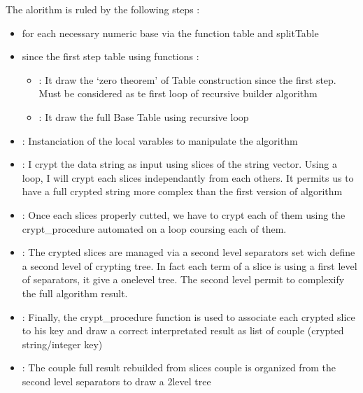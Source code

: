 \documentclass[letterpaper,10pt,english]{sphinxmanual}
\begin{document}
\sphinxAtStartPar
The alorithm is ruled by the following steps :
\begin{itemize}
\item {} 
\sphinxAtStartPar
{} for each necessary numeric base via the function table and splitTable

\item {} 
\sphinxAtStartPar
{} since the first step table using functions :
\begin{itemize}
\item {} 
\sphinxAtStartPar
{} : It draw the ‘zero theorem’ of Table construction since the first step. Must be considered as te first loop of recursive builder algorithm

\item {} 
\sphinxAtStartPar
{} : It draw the full Base Table using recursive loop

\end{itemize}

\item {} 
\sphinxAtStartPar
{} : Instanciation of the local varables to manipulate the algorithm

\item {} 
\sphinxAtStartPar
{} : I crypt the data string as input using slices of the string vector. Using a loop, I will crypt each slices independantly from each others. It permits us to have a full crypted string more complex than the first version of algorithm

\item {} 
\sphinxAtStartPar
{} : Once each slices properly cutted, we have to crypt each of them using the crypt\_procedure automated on a loop coursing each of them.

\item {} 
\sphinxAtStartPar
{} : The crypted slices are managed via a second level separators set wich define a second level of crypting tree. In fact each term of a slice is using a first level of separators, it give a one\sphinxhyphen{}level tree. The second level permit to complexify the full algorithm result.

\item {} 
\sphinxAtStartPar
{} : Finally, the crypt\_procedure function is used to associate each crypted slice to his key and draw a correct interpretated result as list of couple (crypted string/integer key)

\item {} 
\sphinxAtStartPar
{} : The couple full result rebuilded from slices couple is organized from the second level separators to draw a 2\sphinxhyphen{}level tree

\end{itemize}
\end{document}
